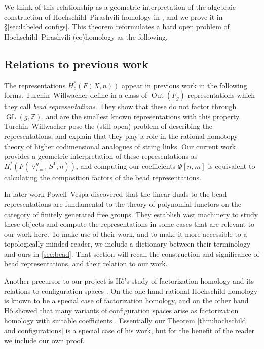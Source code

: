 \documentclass[12pt]{article}
\newcommand{\Z}{\mathbb{Z}}
\DeclareMathOperator{\GL}{GL}
\DeclareMathOperator{\Out}{Out}
\theoremstyle{plain}
\theoremstyle{definition}
\theoremstyle{remark}
\begin{document}
We think of this relationship as a geometric interpretation of the algebraic construction of Hoch\-schild--Pirash\-vili 
homology in \cite{Pir00}, and we prove it in \S\ref{sec:labeled configs}. %
This theorem reformulates a hard open problem of Hochschild--Pirashvili (co)homology \cite[\S 2.5]{TW19} as the following.


\subsection{Relations to previous work}
The representations $H^*_c(F(X,n))$ appear in previous work in the following forms. Turchin--Willwacher define in \cite[\S2.5]{TW19} a class of $\Out(F_g)$-representations which they call \emph{bead representations}. They show that these do not factor through $\GL(g, \Z)$, and are the smallest known representations with this property. Turchin--Willwacher pose the (still open) problem of describing the representations, and explain that they play a role in the rational homotopy theory of higher codimensional analogues of string links. Our current work provides a geometric interpretation of these representations as $H^*_c(F(\vee_{i=1}^g S^1,n))$, and computing our coefficients $\Phi[n,m]$ is equivalent to calculating the composition factors of the bead representations.

In later work Powell--Vespa \cite{PV18} discovered that the linear duals to the bead representations are fundamental to the theory of polynomial functors on the category of finitely generated free groups. They establish vast machinery to study these objects and compute the representations in some cases that are relevant to our work here. To make use of their work, and to make it more accessible to a topologically minded reader, we include a dictionary between their terminology and ours in \ref{sec:bead}. That section will recall the construction and significance of bead representations, and their relation to our work.

Another precursor to our project is Hô's study of factorization homology and its relations to configuration spaces \cite{Ho20}. On the one hand rational Hochschild homology is known to be a special case of factorization homology, and on the other hand Hô showed that many variants of configuration spaces arise as factorization homology with suitable coefficients \cite[Proposition 5.1.9]{Ho20}. Essentially our Theorem \ref{thm:hochschild and configurations} is a special case of his work, but for the benefit of the reader we include our own proof.
\end{document}
